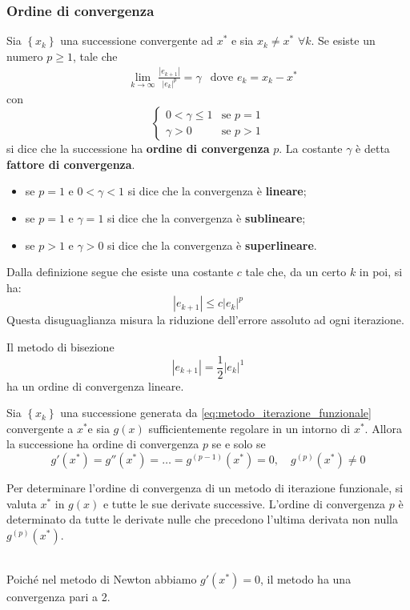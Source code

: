 \documentclass{article}
\begin{document}
\subsubsection*{Ordine di convergenza}
\begin{definition}
    Sia $\left\{x_k\right\}$ una successione convergente ad $x^*$ e sia
    $x_k\neq x^*$ $\forall k$. Se esiste un numero $p\geq 1$, tale
    che
    \begin{equation*}
       \begin{aligned}
           & \lim_{k\to\infty}\frac{\left\lvert e_{k+1}\right\rvert}{\left\lvert
   e_k\right\rvert^p}=\gamma & \text{dove } e_k=x_k-x^*
       \end{aligned} 
    \end{equation*}
    con 
    $$\begin{cases}
        0<\gamma\leq 1 & \text{se }p=1 \\
        \gamma>0 & \text{se }p>1
    \end{cases}$$
    si dice che la successione ha \textbf{ordine di convergenza} $p$. La
    costante $\gamma$ è detta \textbf{fattore di convergenza}.
    \begin{itemize}
        \item se $p=1$ e $0<\gamma<1$ si dice che la convergenza è
            \textbf{lineare};
        \item se $p=1$ e $\gamma=1$ si dice che la convergenza è
            \textbf{sublineare};
        \item se $p>1$ e $\gamma>0$ si dice che la convergenza è
            \textbf{superlineare}.
    \end{itemize}
\end{definition}
\begin{oss}
   Dalla definizione segue che esiste una costante $c$ tale che, da un certo
   $k$ in poi, si ha:
   $$\left\lvert e_{k+1}\right\rvert\leq c \left\lvert e_k\right\rvert^p$$
   Questa disuguaglianza misura la riduzione dell'errore assoluto ad ogni
   iterazione.
\end{oss}
\begin{example}
    Il metodo di bisezione
    $$\left\lvert e_{k+1}\right\rvert= \frac{1}{2}\left\lvert
    e_k\right\rvert^1$$
    ha un ordine di convergenza lineare.
\end{example}
\begin{theorem}
    Sia $\left\{x_k\right\}$ una successione generata da
    \ref{eq:metodo_iterazione_funzionale} convergente a $x^*$e sia $g(x)$
    sufficientemente regolare in un intorno di $x^*$. Allora la successione ha
    ordine di convergenza $p$ se e solo se 
    $$g'(x^*)=g''(x^*)=\ldots=g^{(p-1)}(x^*)=0,\quad g^{(p)}(x^*)\neq0$$
\end{theorem}
Per determinare l'ordine di convergenza di un metodo di iterazione funzionale,
si valuta $x^*$ in $g(x)$ e tutte le sue derivate successive. L'ordine di
convergenza $p$ è determinato da tutte le derivate nulle che precedono
l'ultima derivata non nulla $g^{(p)}(x^*)$.
\begin{oss}\leavevmode\\
    Poiché nel metodo di Newton abbiamo $g'(x^*)=0$, il metodo ha una
    convergenza pari a 2. 
\end{oss}
\end{document}
